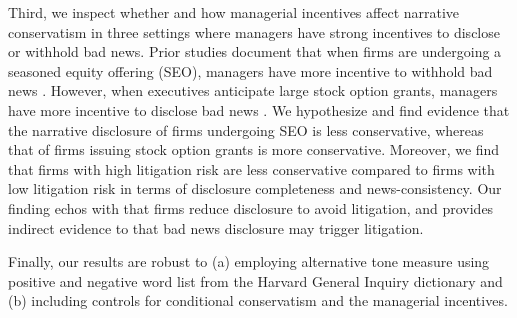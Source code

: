 \documentclass[letterpaper,11pt]{article}
\begin{document}
\begin{spacing}{1.5}
Third, we inspect whether and how managerial incentives affect narrative conservatism in three settings where managers have strong incentives to disclose or withhold bad news. Prior studies document that when firms are undergoing a seasoned equity offering (SEO), managers have more incentive to withhold bad news \cite{teohEarningsManagementUnderperformance1998, langVoluntaryDisclosureEquity2000}. However, when executives anticipate large stock option grants, managers have more incentive to disclose bad news \cite{yermackGoodTimingCEO1997, aboodyCEOStockOption2000}. We hypothesize and find evidence that the narrative disclosure of firms undergoing SEO is less conservative, whereas that of firms issuing stock option grants is more conservative. Moreover, we find that firms with high litigation risk are less conservative compared to firms with low litigation risk in terms of disclosure completeness and news-consistency. Our finding echos with  that firms reduce disclosure to avoid litigation, and provides indirect evidence to  that bad news disclosure may trigger litigation.

Finally, our results are robust to (a) employing alternative tone measure using positive and negative word list from the Harvard General Inquiry dictionary and (b) including controls for conditional conservatism and the managerial incentives.


\end{spacing}
\end{document}
